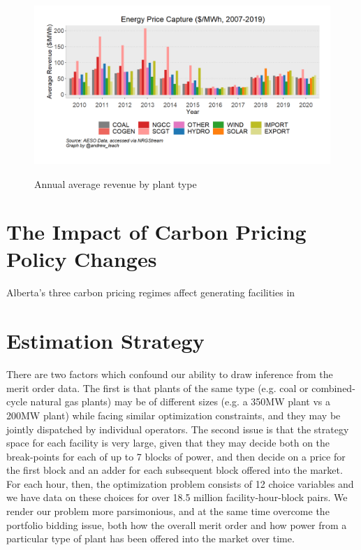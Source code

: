 \documentclass[12pt]{article}
\begin{document}
\begin{figure}[!h]%
	\centering \vspace{-.25cm} \includegraphics[width=6.5in]{images/price_capture.png}
\label{fig:capture_prices}
\vspace{-0.75cm}	\caption{Annual average revenue by plant type}
\end{figure}


\section{The Impact of Carbon Pricing Policy Changes}

Alberta's three carbon pricing regimes affect generating facilities in




\section{Estimation Strategy}
There are two factors which confound our ability to draw inference from the merit order data. The first is that plants of the same type (e.g. coal or combined-cycle natural gas plants) may be of different sizes (e.g. a 350MW plant vs a 200MW plant) while facing similar optimization constraints, and they may be jointly dispatched by individual operators. The second issue is that the strategy space for each facility is very large, given that they may decide both on the break-points for each of up to 7 blocks of power, and then decide on a price for the first block and an adder for each subsequent block offered into the market. For each hour, then, the optimization problem consists of 12 choice variables and we have data on these choices for over 18.5 million facility-hour-block pairs. We render our problem more parsimonious, and at the same time overcome the portfolio bidding issue, both how the overall merit order and how power from a particular type of plant has been offered into the market over time.
\end{document}
